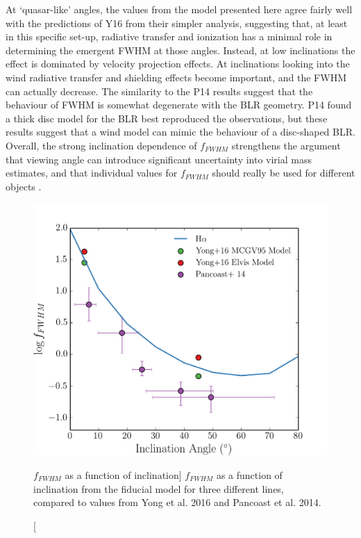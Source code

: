 At `quasar-like' angles, the values from the model presented here 
agree fairly well with the predictions
of Y16 from their simpler analysis, suggesting that,
at least in this specific set-up, 
radiative transfer and ionization has a minimal role in determining
the emergent FWHM at those angles. Instead, at low inclinations 
the effect is dominated by velocity projection
effects. At inclinations looking into the wind radiative transfer
and shielding effects become important, and the FWHM can actually
decrease. The similarity to the P14 results suggest 
that the behaviour of FWHM is somewhat degenerate with the BLR
geometry. P14 found a thick disc model for the BLR best reproduced
the observations, but these results suggest that a wind model can mimic 
the behaviour of a disc-shaped BLR. Overall, the strong inclination dependence
of $f_{FWHM}$ strengthens the argument that viewing angle can introduce
significant uncertainty into virial mass estimates, and that individual
values for $f_{FWHM}$ should really be used for different objects
\citep[e.g.][]{kollatschny2011,pancoast2014a,pancoast2014b,shenho2014,brotherton2015,yong2016}.

\begin{figure}
\centering
\includegraphics[width=1.0\textwidth]{figures/06-agnpaper/f_factor.png}
\caption
[$f_{FWHM}$ as a function of inclination]
{
$f_{FWHM}$ as a function of inclination from the fiducial model
for three different lines, compared to values from
Yong et al. 2016 and Pancoast et al. 2014. 
}
\label{fig:FWHM}
\end{figure}

